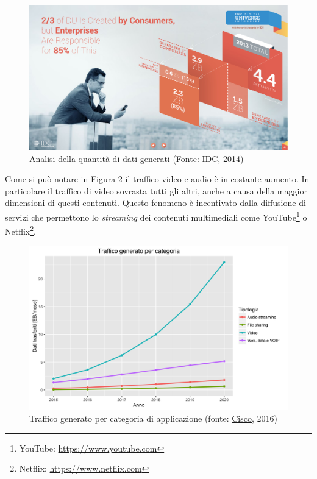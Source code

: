 \begin{figure}[ht]
	\centering
	\includegraphics[width=\textwidth]{1-introduzione/Immagini/dati-generati-consumer.pdf}
	\caption[Analisi della quantità di dati generati]{Analisi della quantità di dati generati (Fonte: \href{http://www.emc.com/leadership/digital-universe/2014iview/executive-summary.htm}{IDC}, 2014)\label{fig:analisi-dati-generati}}
\end{figure}

Come si può notare in Figura \ref{fig:traffico-categoria-applicazione} il traffico video e audio è in costante aumento. In particolare il traffico di video sovrasta tutti gli altri, anche a causa della maggior dimensioni di questi contenuti. Questo fenomeno è incentivato dalla diffusione di servizi che permettono lo \emph{streaming} dei contenuti multimediali come YouTube\footnote{YouTube: \url{https://www.youtube.com}} o Netflix\footnote{Netflix: \url{https://www.netflix.com}}.

\begin{figure}[ht]
	\centering
	\includegraphics[width=\textwidth]{1-introduzione/Immagini/traffico-categoria.png}
	\caption[Traffico generato per categoria di applicazione]{Traffico generato per categoria di applicazione (fonte: \href{http://www.cisco.com/c/en/us/solutions/collateral/service-provider/visual-networking-index-vni/mobile-white-paper-c11-520862.html}{Cisco}, 2016)\label{fig:traffico-categoria-applicazione}}
\end{figure}

